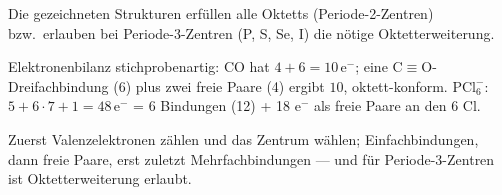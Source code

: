 \begin{ergebnis}
Die gezeichneten Strukturen erfüllen alle Oktetts (Periode-2-Zentren) bzw.\
erlauben bei Periode-3-Zentren (P, S, Se, I) die nötige Oktetterweiterung.
\end{ergebnis}

\begin{kontrolle}
Elektronenbilanz stichprobenartig: $\mathrm{CO}$ hat $4+6=10\,\mathrm{e^-}$; eine
$\mathrm{C\equiv O}$-Dreifachbindung (6) plus zwei freie Paare (4) ergibt $10$,
oktett-konform. $\mathrm{PCl_6^-}$: $5+6\cdot 7+1=48\,\mathrm{e^-}$ = 6 Bindungen
(12) + 18 $\mathrm{e^-}$ als freie Paare an den 6 Cl.
\end{kontrolle}

\begin{merksatz}
Zuerst Valenzelektronen zählen und das Zentrum wählen; Einfachbindungen, dann
freie Paare, erst zuletzt Mehrfachbindungen --- und für Periode-3-Zentren ist
Oktetterweiterung erlaubt.
\end{merksatz}

